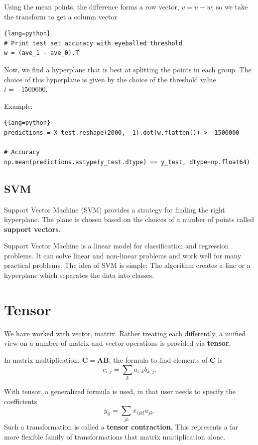 Using the mean points, the difference forms a row vector, $v=u-w$; so we take
the transform to get a column vector
\begin{lstlisting}{lang=python}
# Print test set accuracy with eyeballed threshold
w = (ave_1 - ave_0).T
\end{lstlisting}

Now, we find a hyperplane that is best at splitting the points in each group.
The choice of this hyperplane is given by the choice of the threshold value
$t=-1500000$.

Example: 
\begin{lstlisting}{lang=python}
predictions = X_test.reshape(2000, -1).dot(w.flatten()) > -1500000

# Accuracy
np.mean(predictions.astype(y_test.dtype) == y_test, dtype=np.float64)
\end{lstlisting}


\subsection{SVM}
\label{sec:math-hyperplane-SVM}

Support Vector Machine (SVM) provides a strategy for finding the right
hyperplane. The plane is chosen based on the choices of a number of points
called {\bf support vectors}.


Support Vector Machine is a linear model for classification and regression
problems. It can solve linear and non-linear problems and work well for many
practical problems. The idea of SVM is simple: The algorithm creates a line or a
hyperplane which separates the data into classes.
 
 
\section{Tensor}
\label{sec:tensor}

We have worked with vector, matrix.
Rather treating each differently, a unified view on a number of matrix and
vector operations is provided via {\bf tensor}. 

In matrix multiplication, $\mathbf{C = A B}$, the formula to find elements of $\mathbf{C}$ is
\begin{equation}
c_{i, j} = \sum_{k} a_{i, k}b_{k, j}.
\end{equation}

With tensor, a generalized formula is used, in that user needs to specify the coefficients
\begin{equation}
y_{il} = \sum_{jk} x_{ijkl}a_{jk}.
\end{equation}
Such a transformation is called a {\bf tensor contraction.}
This represents a far more flexible family of transformations
that matrix multiplication alone.

